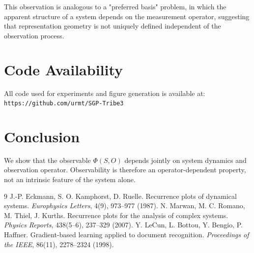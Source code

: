 \documentclass[11pt]{article}
\begin{document}
This observation is analogous to a "preferred basis" problem, in which the apparent structure of a system depends on the measurement operator, suggesting that representation geometry is not uniquely defined independent of the observation process.

\section*{Code Availability}
All code used for experiments and figure generation is available at:
\texttt{https://github.com/urmt/SGP-Tribe3}

\section{Conclusion}

We show that the observable $\Phi(S, O)$ depends jointly on system dynamics and observation operator. Observability is therefore an operator-dependent property, not an intrinsic feature of the system alone.

\begin{thebibliography}{9}
	J.-P. Eckmann, S. O. Kamphorst, D. Ruelle.
	Recurrence plots of dynamical systems.
	\textit{Europhysics Letters}, 4(9), 973--977 (1987).
	N. Marwan, M. C. Romano, M. Thiel, J. Kurths.
	Recurrence plots for the analysis of complex systems.
	\textit{Physics Reports}, 438(5--6), 237--329 (2007).
	Y. LeCun, L. Bottou, Y. Bengio, P. Haffner.
	Gradient-based learning applied to document recognition.
	\textit{Proceedings of the IEEE}, 86(11), 2278--2324 (1998).
\end{thebibliography}
\end{document}
